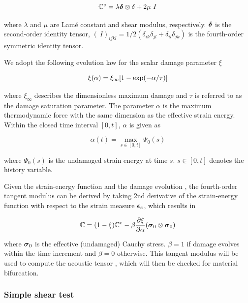 \documentclass[12pt]{article}
\numberwithin{equation}{section}
\begin{document}
\begin{equation}
  \mathbb{C}^e = \lambda {\boldsymbol{\delta}}\otimes\delta + 2\mu~I
\end{equation}

where $\lambda$ and $\mu$ are Lam\'{e} constant and shear modulus,
respectively. ${\boldsymbol{\delta}}$ is the second-order identity tensor,
$(~I)_{ijkl} = 1/2(\delta_{ik}\delta_{jl} +
\delta_{il}\delta_{jk})$ is the fourth-order symmetric identity
tensor.

We adopt the following evolution law for the scalar damage parameter $
\xi$ \cite{Holzapfel:2000}

\begin{equation}\label{eq:iso_xi}
  \xi(\alpha) = \xi_{\infty} [ 1- {\rm exp}(-\alpha / \tau)]
\end{equation}

where $\xi_{\infty}$ describes the dimensionless maximum damage and
$\tau$ is referred to as the damage saturation parameter. The
parameter $\alpha$ is the maximum thermodynamic force
\cite{Holzapfel:2000} with the same dimension as the effective strain
energy. Within the closed time interval $[0,t]$, $\alpha$ is given as

\begin{equation}\label{eq:alpha}
  \alpha(t) = \max_{s\in [0,t]}\Psi_0(s)
\end{equation}

where $\Psi_0(s)$ is the undamaged strain energy at time $s$.
$s \in [0,t]$ denotes the history variable.

Given the strain-energy function  and the damage
evolution , the fourth-order tangent modulus can be
derived by taking 2nd derivative of the strain-energy function with
respect to the strain measure ${\boldsymbol{\epsilon}}_e$, which results in

\begin{equation}
  \mathbb{C} = (1-\xi)\mathbb{C}^e
    - \beta \frac{\partial\xi}{\partial\alpha}
    ({\boldsymbol{\sigma}}_0\otimes{\boldsymbol{\sigma}}_0)
\end{equation}

where ${\boldsymbol{\sigma}}_0$ is the effective (undamaged) Cauchy stress.
$\beta = 1$ if damage evolves within the time increment and $\beta=0$
otherwise. This tangent modulus will be used to compute the acoustic
tensor , which will then be checked for
material bifurcation.

\subsubsection{Simple shear test}
\end{document}
